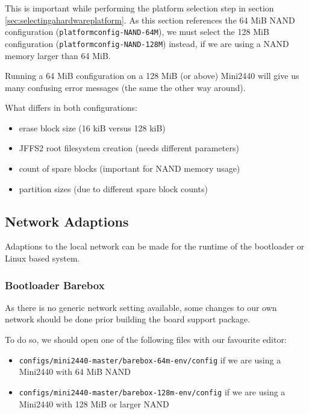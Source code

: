 This is important while performing the platform selection step in section
\ref{sec:selectingahardwareplatform}.
As this section references the 64 MiB NAND configuration
(\texttt{platformconfig-NAND-64M}), we must select the 128 MiB configuration
(\texttt{platformconfig-NAND-128M}) instead, if we are using a NAND memory
larger than 64 MiB.

\begin{important}
Running a 64 MiB configuration on a 128 MiB (or above) Mini2440 will
give us many confusing error messages (the same the other way around).
\end{important}

What differs in both configurations:
\begin{itemize}
 \item erase block size (16 kiB versus 128 kiB)
 \item JFFS2 root filesystem creation (needs different parameters)
 \item count of spare blocks (important for NAND memory usage)
 \item partition sizes (due to different spare block counts)
\end{itemize}

\subsection{Network Adaptions}		\label{sec:networkadaptions}

Adaptions to the local network can be made for the runtime of the bootloader
or Linux based system.

\subsubsection{Bootloader Barebox}		\label{sec:bootloadernetwork}

As there is no generic network setting available, some changes to our own
network should be done prior building the board support package.

To do so, we should open one of the following files with our favourite editor:

\begin{itemize}
 \item \texttt{configs/mini2440-master/barebox-64m-env/config} if we are using
 a Mini2440 with 64 MiB NAND
 \item \texttt{configs/mini2440-master/barebox-128m-env/config} if we are using
 a Mini2440 with 128 MiB or larger NAND
\end{itemize}

